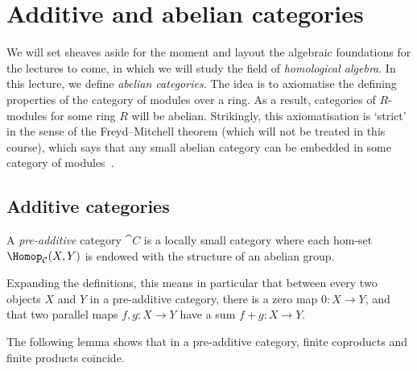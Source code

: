 \documentclass[../main.tex]{subfiles}
\begin{document}
\chapter{Additive and abelian categories}
We will set sheaves aside for the moment and layout the algebraic foundations for the lectures to come, in which we will study the field of \emph{homological algebra}.
In this lecture, we define \emph{abelian categories}.
The idea is to axiomatise the defining properties of the category of modules over a ring.
As a result, categories of \(R\)-modules for some ring \(R\) will be abelian.
Strikingly, this axiomatisation is `strict' in the sense of the Freyd--Mitchell theorem (which will not be treated in this course), which says that any small abelian category can be embedded in some category of modules~\cite[Theorem~1.6.1]{WeibelHomologicalAlgebra}. 

\section{Additive categories}
\begin{defn}
  A \emph{pre-additive} category $\cat C$ is a locally small category where each hom-set $\Hom_{\cat C}(X, Y)$ is endowed with the structure of an abelian group.
\end{defn}

Expanding the definitions, this means in particular that between every two objects \(X\) and \(Y\) in a pre-additive category, there is a zero map \(0\colon X\to Y\), and that two parallel maps \(f,g\colon X\to Y\) have a sum \(f+g\colon X\to Y\).

The following lemma shows that in a pre-additive category, finite coproducts and finite products coincide.
\end{document}

